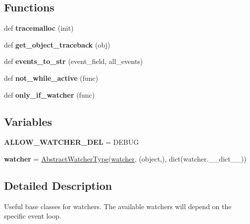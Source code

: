 \subsection*{Functions}
\begin{DoxyCompactItemize}
\item 
\mbox{\label{namespacegevent_1_1__ffi_1_1watcher_a394e5e098ccb509436a52fdf04ab6add}} 
def {\bfseries tracemalloc} (init)
\item 
\mbox{\label{namespacegevent_1_1__ffi_1_1watcher_a529317d8829f356f2ab55788a83af656}} 
def {\bfseries get\+\_\+object\+\_\+traceback} (obj)
\item 
\mbox{\label{namespacegevent_1_1__ffi_1_1watcher_a68500c881f72cdb162af53c4f14d9cff}} 
def {\bfseries events\+\_\+to\+\_\+str} (event\+\_\+field, all\+\_\+events)
\item 
\mbox{\label{namespacegevent_1_1__ffi_1_1watcher_ac713b82d4a55b2688bccf0493b4e8b91}} 
def {\bfseries not\+\_\+while\+\_\+active} (func)
\item 
\mbox{\label{namespacegevent_1_1__ffi_1_1watcher_a64715777b4b15d9cde4580f3da344bd7}} 
def {\bfseries only\+\_\+if\+\_\+watcher} (func)
\end{DoxyCompactItemize}
\subsection*{Variables}
\begin{DoxyCompactItemize}
\item 
\mbox{\label{namespacegevent_1_1__ffi_1_1watcher_a63db3d427c8632902128ddb3197d269b}} 
{\bfseries A\+L\+L\+O\+W\+\_\+\+W\+A\+T\+C\+H\+E\+R\+\_\+\+D\+EL} = D\+E\+B\+UG
\item 
\mbox{\label{namespacegevent_1_1__ffi_1_1watcher_a7ecadcb145d72cadb0482f35abc13592}} 
{\bfseries watcher} = \hyperlink{classgevent_1_1__ffi_1_1watcher_1_1_abstract_watcher_type}{Abstract\+Watcher\+Type}(\textquotesingle{}\hyperlink{classgevent_1_1__ffi_1_1watcher_1_1watcher}{watcher}\textquotesingle{}, (object,), dict(watcher.\+\_\+\+\_\+dict\+\_\+\+\_\+))
\end{DoxyCompactItemize}


\subsection{Detailed Description}
\begin{DoxyVerb}Useful base classes for watchers. The available
watchers will depend on the specific event loop.
\end{DoxyVerb}
 